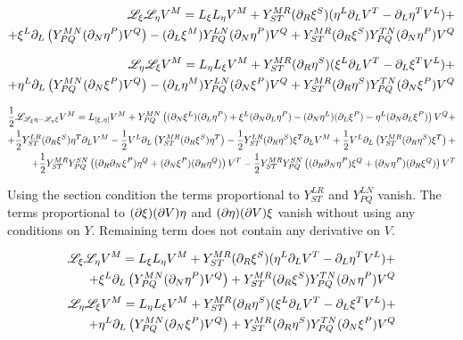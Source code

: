 \documentclass{article}
\begin{document}
\begin{align}
    \mathscr{L}_\xi\mathscr{L}_\eta V^M = L_\xi L_\eta V^M+Y^{MR}_{ST}(\partial_R\xi^S)(\eta^L\partial_L V^T-\partial_L\eta^T V^L)+\\
    +\xi^L\partial_L\left(Y^{MN}_{PQ}(\partial_N\eta^P)V^Q\right)-(\partial_L\xi^M)Y^{LN}_{PQ}(\partial_N\eta^P)V^Q+Y^{MR}_{ST}(\partial_R\xi^S)Y^{TN}_{PQ}(\partial_N\eta^P)V^Q
\end{align}

\begin{align}
    \mathscr{L}_\eta\mathscr{L}_\xi V^M = L_\eta L_\xi V^M+Y^{MR}_{ST}(\partial_R\eta^S)(\xi^L\partial_L V^T-\partial_L\xi^T V^L)+\\
    +\eta^L\partial_L\left(Y^{MN}_{PQ}(\partial_N\xi^P)V^Q\right)-(\partial_L\eta^M)Y^{LN}_{PQ}(\partial_N\xi^P)V^Q+Y^{MR}_{ST}(\partial_R\eta^S)Y^{TN}_{PQ}(\partial_N\xi^P)V^Q
\end{align}

\begin{align}
\frac{1}{2}\mathscr{L}_{\mathscr{L_\xi}\eta-\mathscr{L_\eta}\xi}V^M = L_{[\xi,\eta]}V^M+Y^{MN}_{PQ}\left((\partial_N\xi^L)(\partial_L\eta^P)+\xi^L(\partial_N\partial_L\eta^P)-(\partial_N\eta^L)(\partial_L\xi^P)-\eta^L(\partial_N\partial_L\xi^P)\right)V^Q+\\
+\frac{1}{2}Y^{LR}_{ST}(\partial_R\xi^S)\eta^T\partial_LV^M-\frac{1}{2}V^L\partial_L\left(Y^{MR}_{ST}(\partial_R\xi^S)\eta^T\right)-\frac{1}{2}Y^{LR}_{ST}(\partial_R\eta^S)\xi^T\partial_LV^M+\frac{1}{2}V^L\partial_L\left(Y^{MR}_{ST}(\partial_R\eta^S)\xi^T\right)+\\
+\frac{1}{2}Y^{MR}_{ST}Y^{SN}_{PQ}\left((\partial_R\partial_N\xi^P)\eta^Q+(\partial_N\xi^P)(\partial_R\eta^Q)\right)V^T-\frac{1}{2}Y^{MR}_{ST}Y^{SN}_{PQ}\left((\partial_R\partial_N\eta^P)\xi^Q+(\partial_N\eta^P)(\partial_R\xi^Q)\right)V^T
\end{align}

Using the section condition the terms proportional to $Y^{LR}_{ST}$ and $Y^{LN}_{PQ}$ vanish. The terms proportional to $(\partial\xi)(\partial V)\eta$ and $(\partial\eta)(\partial V)\xi$ vanish without using any conditions on $Y$. Remaining term does not contain any derivative on $V$. 

\begin{align}
    \mathscr{L}_\xi\mathscr{L}_\eta V^M = L_\xi L_\eta V^M+Y^{MR}_{ST}(\partial_R\xi^S)(\eta^L\partial_L V^T-\partial_L\eta^T V^L)+\\
    +\xi^L\partial_L\left(Y^{MN}_{PQ}(\partial_N\eta^P)V^Q\right)+Y^{MR}_{ST}(\partial_R\xi^S)Y^{TN}_{PQ}(\partial_N\eta^P)V^Q
\end{align}
\begin{align}
    \mathscr{L}_\eta\mathscr{L}_\xi V^M = L_\eta L_\xi V^M+Y^{MR}_{ST}(\partial_R\eta^S)(\xi^L\partial_L V^T-\partial_L\xi^T V^L)+\\
    +\eta^L\partial_L\left(Y^{MN}_{PQ}(\partial_N\xi^P)V^Q\right)+Y^{MR}_{ST}(\partial_R\eta^S)Y^{TN}_{PQ}(\partial_N\xi^P)V^Q
\end{align}
\end{document}
